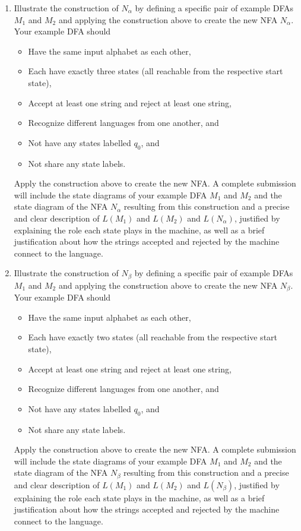 \begin{enumerate}[wide, labelwidth=!, labelindent=0pt]
\begin{enumerate}
\item\gradeCorrect 
Illustrate the construction of $N_{\alpha}$ by defining a specific pair 
of example DFAs $M_1$ and $M_2$ and applying the 
construction above to create the new NFA $N_\alpha$. Your example DFA should
\begin{itemize}
    \item Have the same input alphabet as each other, 
    \item Each have exactly three states (all reachable from the respective start state),
    \item Accept at least one string and reject at least one string, 
    \item Recognize different languages from one another, and
    \item Not have any states labelled $q_0$, and 
    \item Not share any state labels.
\end{itemize}
Apply the construction above to create the new NFA. A complete submission 
will include the state diagrams of your example DFA $M_1$ and $M_2$ and the state diagram of the NFA $N_\alpha$ resulting 
from this construction and a precise and clear description of $L(M_1)$ and $L(M_2)$ and $L(N_{\alpha})$, justified
by explaining the role each state plays in the machine, as well as a brief 
justification about how the strings accepted and rejected by the machine connect to the language.

\item\gradeCorrect 
Illustrate the construction of $N_{\beta}$ by defining a specific pair 
of example DFAs $M_1$ and $M_2$ and applying the 
construction above to create the new NFA $N_\beta$. Your example DFA should
\begin{itemize}
    \item Have the same input alphabet as each other, 
    \item Each have exactly two states (all reachable from the respective start state),
    \item Accept at least one string and reject at least one string, 
    \item Recognize different languages from one another, and
    \item Not have any states labelled $q_0$, and 
    \item Not share any state labels.
\end{itemize}
Apply the construction above to create the new NFA. A complete submission 
will include the state diagrams of your example DFA $M_1$ and $M_2$ and the state diagram of the NFA $N_\beta$ resulting 
from this construction and a precise and clear description of $L(M_1)$ and $L(M_2)$ and $L(N_{\beta})$, justified
by explaining the role each state plays in the machine, as well as a brief 
justification about how the strings accepted and rejected by the machine connect to the language.



\end{enumerate}
\end{enumerate}
